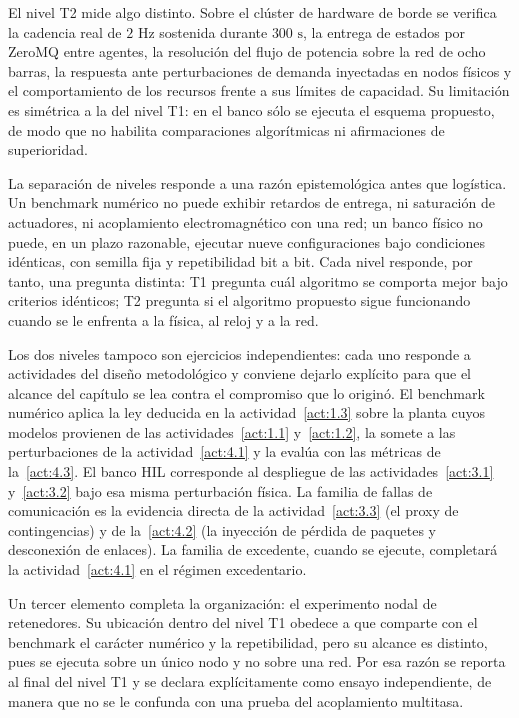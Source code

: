 El nivel T2 mide algo distinto. Sobre el clúster de hardware de borde se verifica la cadencia real de $2\text{ Hz}$ sostenida durante $300\text{ s}$, la entrega de estados por ZeroMQ entre agentes, la resolución del flujo de potencia sobre la red de ocho barras, la respuesta ante perturbaciones de demanda inyectadas en nodos físicos y el comportamiento de los recursos frente a sus límites de capacidad. Su limitación es simétrica a la del nivel T1: en el banco sólo se ejecuta el esquema propuesto, de modo que no habilita comparaciones algorítmicas ni afirmaciones de superioridad.

La separación de niveles responde a una razón epistemológica antes que logística. Un benchmark numérico no puede exhibir retardos de entrega, ni saturación de actuadores, ni acoplamiento electromagnético con una red; un banco físico no puede, en un plazo razonable, ejecutar nueve configuraciones bajo condiciones idénticas, con semilla fija y repetibilidad bit a bit. Cada nivel responde, por tanto, una pregunta distinta: T1 pregunta cuál algoritmo se comporta mejor bajo criterios idénticos; T2 pregunta si el algoritmo propuesto sigue funcionando cuando se le enfrenta a la física, al reloj y a la red.

Los dos niveles tampoco son ejercicios independientes: cada uno responde a actividades del diseño metodológico y conviene dejarlo explícito para que el alcance del capítulo se lea contra el compromiso que lo originó. El benchmark numérico aplica la ley deducida en la actividad~\ref{act:1.3} sobre la planta cuyos modelos provienen de las actividades~\ref{act:1.1} y~\ref{act:1.2}, la somete a las perturbaciones de la actividad~\ref{act:4.1} y la evalúa con las métricas de la~\ref{act:4.3}. El banco HIL corresponde al despliegue de las actividades~\ref{act:3.1} y~\ref{act:3.2} bajo esa misma perturbación física. La familia de fallas de comunicación es la evidencia directa de la actividad~\ref{act:3.3} (el proxy de contingencias) y de la~\ref{act:4.2} (la inyección de pérdida de paquetes y desconexión de enlaces). La familia de excedente, cuando se ejecute, completará la actividad~\ref{act:4.1} en el régimen excedentario.


Un tercer elemento completa la organización: el experimento nodal de retenedores. Su ubicación dentro del nivel T1 obedece a que comparte con el benchmark el carácter numérico y la repetibilidad, pero su alcance es distinto, pues se ejecuta sobre un único nodo y no sobre una red. Por esa razón se reporta al final del nivel T1 y se declara explícitamente como ensayo independiente, de manera que no se le confunda con una prueba del acoplamiento multitasa.

